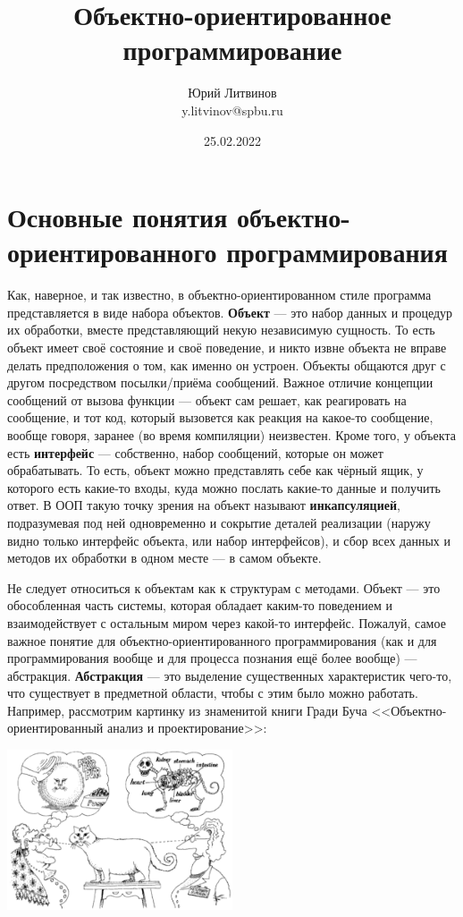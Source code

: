 \documentclass[a5paper]{article}
\title{Объектно-ориентированное программирование}
\author{Юрий Литвинов\\\small{y.litvinov@spbu.ru}}
\date{25.02.2022}
\begin{document}
\maketitle
\thispagestyle{empty}

\section{Основные понятия объектно-ориентированного программирования}

Как, наверное, и так известно, в объектно-ориентированном стиле программа представляется в виде набора объектов. \textbf{Объект} --- это набор данных и процедур их обработки, вместе представляющий некую независимую сущность. То есть объект имеет своё состояние и своё поведение, и никто извне объекта не вправе делать предположения о том, как именно он устроен. Объекты общаются друг с другом посредством посылки/приёма сообщений. Важное отличие концепции сообщений от вызова функции --- объект сам решает, как реагировать на сообщение, и тот код, который вызовется как реакция на какое-то сообщение, вообще говоря, заранее (во время компиляции) неизвестен. Кроме того, у объекта есть \textbf{интерфейс} --- собственно, набор сообщений, которые он может обрабатывать. То есть, объект можно представлять себе как чёрный ящик, у которого есть какие-то входы, куда можно послать какие-то данные и получить ответ. В ООП такую точку зрения на объект называют \textbf{инкапсуляцией}, подразумевая под ней одновременно и сокрытие деталей реализации (наружу видно только интерфейс объекта, или набор интерфейсов), и сбор всех данных и методов их обработки в одном месте --- в самом объекте.

Не следует относиться к объектам как к структурам с методами. Объект --- это обособленная часть системы, которая обладает каким-то поведением и взаимодействует с остальным миром через какой-то интерфейс. Пожалуй, самое важное понятие для объектно-ориентированного программирования (как и для программирования вообще и для процесса познания ещё более вообще) --- абстракция. \textbf{Абстракция} --- это выделение существенных характеристик чего-то, что существует в предметной области, чтобы с этим было можно работать. Например, рассмотрим картинку из знаменитой книги Гради Буча <<Объектно-ориентированный анализ и проектирование>>:

\begin{center}
    \includegraphics[width=0.5\textwidth]{abstraction.png}
\end{center}
\end{document}
